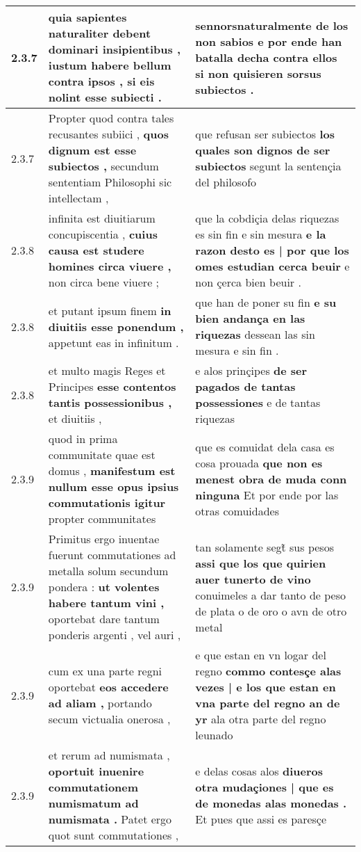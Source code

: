\begin{tabular}{|p{1cm}|p{6.5cm}|p{6.5cm}|}
2.3.7 & quia sapientes naturaliter debent dominari insipientibus , \textbf{ iustum habere bellum contra ipsos , } si eis nolint esse subiecti . & sennorsnaturalmente de los non sabios \textbf{ e por ende han batalla decha contra ellos } si non quisieren sorsus subiectos . \\\hline
2.3.7 & Propter quod contra tales recusantes subiici , \textbf{ quos dignum est esse subiectos , } secundum sententiam Philosophi sic intellectam , & que refusan ser subiectos \textbf{ los quales son dignos de ser subiectos } segunt la sentençia del philosofo \\\hline
2.3.8 & infinita est diuitiarum concupiscentia , \textbf{ cuius causa est studere homines circa viuere , } non circa bene viuere ; & que la cobdiçia delas riquezas es sin fin e sin mesura \textbf{ e la razon desto es | por que los omes estudian cerca beuir } e non çerca bien beuir . \\\hline
2.3.8 & et putant ipsum finem \textbf{ in diuitiis esse ponendum , } appetunt eas in infinitum . & que han de poner su fin \textbf{ e su bien andança en las riquezas } dessean las sin mesura e sin fin . \\\hline
2.3.8 & et multo magis Reges et Principes \textbf{ esse contentos tantis possessionibus , } et diuitiis , & e alos prinçipes \textbf{ de ser pagados de tantas possessiones } e de tantas riquezas \\\hline
2.3.9 & quod in prima communitate quae est domus , \textbf{ manifestum est nullum esse opus ipsius commutationis igitur } propter communitates & que es comuidat dela casa es cosa prouada \textbf{ que non es menest obra de muda conn ninguna } Et por ende por las otras comuidades \\\hline
2.3.9 & Primitus ergo inuentae fuerunt commutationes ad metalla solum secundum pondera : \textbf{ ut volentes habere tantum vini , } oportebat dare tantum ponderis argenti , vel auri , & tan solamente segt̃ sus pesos \textbf{ assi que los que quirien auer tunerto de vino } conuimeles a dar tanto de peso de plata o de oro o avn de otro metal \\\hline
2.3.9 & cum ex una parte regni oportebat \textbf{ eos accedere ad aliam , } portando secum victualia onerosa , & e que estan en vn logar del regno \textbf{ commo contesçe alas vezes | e los que estan en vna parte del regno an de yr } ala otra parte del regno leunado \\\hline
2.3.9 & et rerum ad numismata , \textbf{ oportuit inuenire commutationem numismatum ad numismata . } Patet ergo quot sunt commutationes , & e delas cosas alos \textbf{ diueros otra mudaçiones | que es de monedas alas monedas . } Et pues que assi es paresçe \\\hline

\end{tabular}
